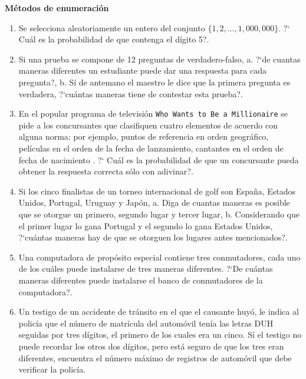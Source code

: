 \documentclass[a4paper,11pt]{report}
\begin{document}
\vspace{0.5cm}

\textbf{M\'etodos de enumeraci\'on}

\vspace{0.3cm}

\begin{enumerate}
\item Se selecciona aleatoriamente un entero del conjunto $\{1, 2,\dots , 1,000, 000\}$. ?` Cu\'al es la probabilidad de que contenga el d\'igito 5?.
\item  Si una prueba se compone de 12 preguntas de verdadero-falso, a. ?`de cuantas maneras diferentes un estudiante puede dar una respuesta para cada pregunta?, b. S\'i de antemano el maestro le dice que la primera pregunta es verdadera, ?`cu\'antas maneras tiene de contestar esta prueba?.
\item En el popular programa de televisi\'on \texttt{Who Wants to Be a Millionaire} se pide a los concursantes que clasifiquen   cuatro elementos de acuerdo con alguna norma: por ejemplo, puntos de referencia en  orden geogr\'afico, pel\'iculas en el orden de la fecha de lanzamiento, cantantes en el orden de fecha de nacimiento . ?` Cu\'al es la probabilidad de que un concursante pueda obtener la respuesta correcta s\'olo con adivinar?.
\item  Si los cinco finalistas de un torneo internacional de golf son Espa\~na, Estados Unidos, Portugal, Uruguay y Jap\'on, a. Diga de cuantas maneras es posible que se otorgue un primero, segundo lugar y tercer lugar, b. Considerando que el primer lugar lo gana Portugal y el segundo lo gana Estados Unidos, ?`cu\'antas maneras hay de que se otorguen los lugares antes mencionados?.  

\item Una computadora de prop\'osito especial contiene tres conmutadores, cada uno de los cu\'ales puede instalarse de tres maneras diferentes. ?`De cu\'antas maneras diferentes puede instalarse el banco de conmutadores de la computadora?.   

\item Un testigo de un accidente de tr\'ansito en el que el causante huy\'o, le indica al polic\'ia que el n\'umero de matr\'icula del autom\'ovil ten\'ia las letras DUH seguidas por tres d\'igitos, el primero de los cuales era un cinco. S\'i el testigo no puede recordar los otros dos d\'igitos, pero est\'a seguro de que los tres eran diferentes, encuentra el n\'umero m\'aximo de  registros de autom\'ovil que debe verificar la polic\'ia.


\end{enumerate}
\end{document}

